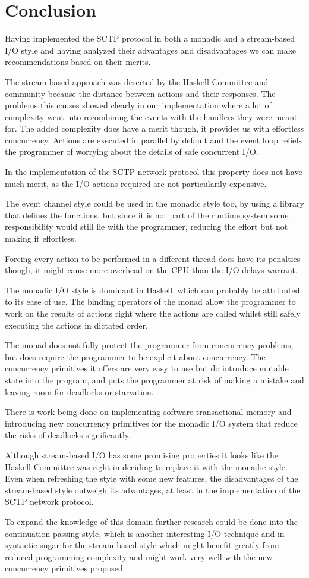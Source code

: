\chapter{Conclusion}
Having implemented the SCTP protocol in both a monadic and a stream-based I/O style and having analyzed their advantages and disadvantages we can make recommendations based on their merits.

The stream-based approach was deserted by the Haskell Committee and community because the distance between actions and their responses. The problems this causes showed clearly in our implementation where a lot of complexity went into recombining the events with the handlers they were meant for. 
The added complexity does have a merit though, it provides us with effortless concurrency. Actions are executed in parallel by default and the event loop reliefs the programmer of worrying about the details of safe concurrent I/O.

In the implementation of the SCTP network protocol this property does not have much merit, as the I/O actions required are not particularily expensive.

The event channel style could be used in the monadic style too, by using a library that defines the functions, but since it is not part of the runtime system some responsibility would still lie with the programmer, reducing the effort but not making it effortless.

Forcing every action to be performed in a different thread does have its penalties though, it might cause more overhead on the CPU than the I/O delays warrant.

The monadic I/O style is dominant in Haskell, which can probably be attributed to its ease of use. The binding operators of the monad allow the programmer to work on the results of actions right where the actions are called whilst still safely executing the actions in dictated order.

The monad does not fully protect the programmer from concurrency problems, but does require the programmer to be explicit about concurrency.
	The concurrency primitives it offers are very easy to use but do introduce mutable state into the program, and puts the programmer at risk of making a mistake and leaving room for deadlocks or starvation.

There is work being done on implementing software transactional memory and introducing new concurrency primitives for the monadic I/O system that reduce the risks of deadlocks significantly.

Although stream-based I/O has some promising properties it looks like the Haskell Committee was right in deciding to replace it with the monadic style. Even when refreshing the style with some new features, the disadvantages of the stream-based style outweigh its advantages, at least in the implementation of the SCTP network protocol.

To expand the knowledge of this domain further research could be done into the continuation passing style, which is another interesting I/O technique and in syntactic sugar for the stream-based style which might benefit greatly from reduced programming complexity and might work very well with the new concurrency primitives proposed.
